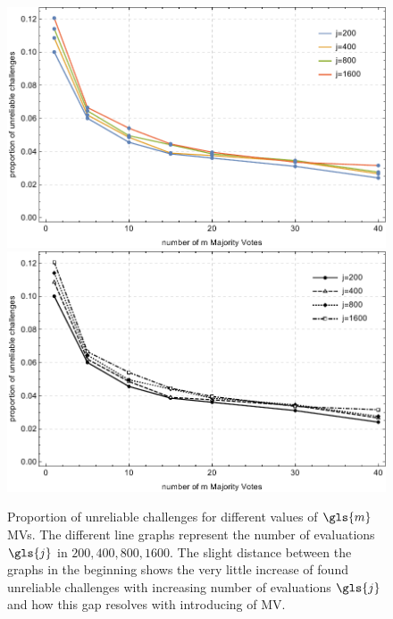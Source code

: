 \begin{figure}[ht]
\ifx{}\undefined
{}
\else
	\if{}
	\centering
	\includegraphics[width=1.00\textwidth]{images/mv-measurements-unstableChallenges.pdf}
	\else
	\includegraphics[width=1.00\textwidth]{images/mv-measurements-unstableChallenges_mono.pdf}
	\fi
\fi
\caption[Proportion of unreliable challenges]{Proportion of unreliable challenges for different values of $\gls{m}$ \acp{MV}. The different line graphs represent the number of evaluations $\gls{j}$ in $200, 400, 800, 1600$. The slight distance between the graphs in the beginning shows the very little increase of found unreliable challenges with increasing number of evaluations $\gls{j}$ and how this gap resolves with introducing of \ac{MV}.}
\label{fig:cmamajorityvotemeasurementrelation}
\end{figure}


